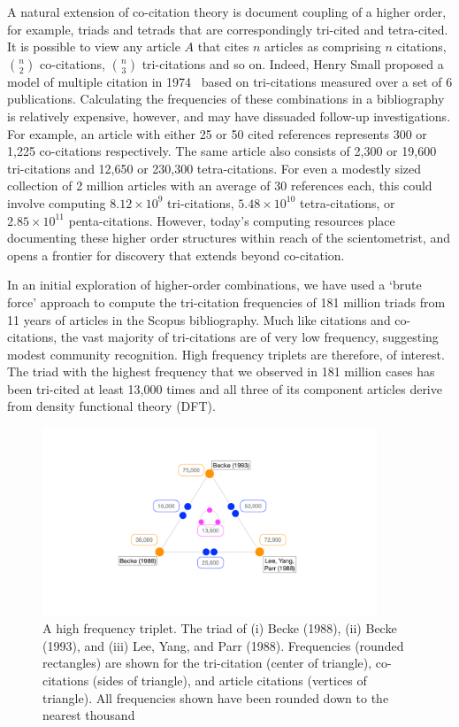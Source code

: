 \documentclass[11pt, oneside]{article}   	%
\begin{document}
A natural extension of co-citation theory is document coupling of a higher order, for example, triads and tetrads that are correspondingly tri-cited and tetra-cited. It is possible to view any article $A$ that cites $n$ articles as comprising $n$ citations, $n\choose2$ co-citations, $n\choose3$ tri-citations and so on. Indeed, Henry Small proposed a model of multiple citation in 1974~\citep{small1974multiple} based on tri-citations measured over a set of 6 publications.  Calculating the frequencies of these combinations in a bibliography is relatively expensive, however, and may have dissuaded follow-up investigations. For example, an article with either 25 or 50 cited references represents 300 or 1,225 co-citations respectively. The same article also consists of  2,300 or 19,600 tri-citations and  12,650 or  230,300 tetra-citations. For even a modestly sized collection of 2 million articles with an average of 30 references each, this could involve computing $8.12\times10^9$ tri-citations, $5.48\times10^{10}$ tetra-citations, or $2.85\times10^{11}$ penta-citations. However, today's computing resources place documenting these higher order structures within reach of the scientometrist, and opens a frontier for discovery that extends beyond co-citation.



In an initial exploration of higher-order combinations, we have used a `brute force' approach to compute the tri-citation frequencies of 181 million triads from 11 years of articles in the Scopus bibliography.  Much like citations and co-citations, the vast majority of tri-citations are of very low frequency, suggesting modest community recognition. High frequency triplets are therefore, of interest. The triad with the highest frequency that we observed in 181 million cases has been tri-cited at least 13,000 times and all three of its component articles derive from density functional theory (DFT). 
\begin{figure}[h!]
\begin{center}
\includegraphics[width=10cm]{fig1_tricite.pdf}%
\end{center}
\caption{A high frequency triplet. The triad of (i) Becke (1988), (ii) Becke (1993), and (iii) Lee, Yang, and Parr (1988).  Frequencies (rounded rectangles) are shown for the tri-citation (center of triangle), co-citations (sides of triangle), and article citations (vertices of triangle). All frequencies shown have been rounded down to the nearest thousand
}
\label{fig:fig1}
\end{figure}
\end{document}
